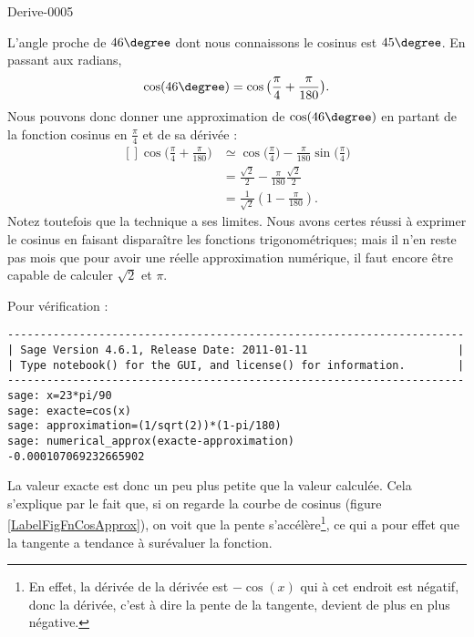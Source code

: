 
\begin{corrige}{Derive-0005}

    L'angle proche de $46\degree$ dont nous connaissons le cosinus est $45\degree$. En passant aux radians,
    \begin{equation}
        \cos(46\degree)=\cos\big( \frac{ \pi }{ 4 }+\frac{ \pi }{ 180 } \big).
    \end{equation}
    Nous pouvons donc donner une approximation de $\cos(46\degree)$ en partant de la fonction cosinus en $\frac{ \pi }{ 4 }$ et de sa dérivée :
    \begin{equation}
        \begin{aligned}[]
            \cos\big( \frac{ \pi }{ 4 }+\frac{ \pi }{ 180 } \big)&\simeq\cos\big( \frac{ \pi }{ 4 } \big)-\frac{ \pi }{ 180 }\sin\big( \frac{ \pi }{ 4 } \big)\\
            &=\frac{ \sqrt{2} }{2}-\frac{ \pi }{ 180 }\frac{ \sqrt{2} }{2}\\
            &=\frac{1}{ \sqrt{2} }\left( 1-\frac{ \pi }{ 180 } \right).
        \end{aligned}
    \end{equation}
    Notez toutefois que la technique a ses limites. Nous avons certes réussi à exprimer le cosinus en faisant disparaître les fonctions trigonométriques; mais il n'en reste pas mois que pour avoir une réelle approximation numérique, il faut encore être capable de calculer $\sqrt{2}$ et $\pi$.

    Pour vérification :
    \begin{verbatim}
----------------------------------------------------------------------
| Sage Version 4.6.1, Release Date: 2011-01-11                       |
| Type notebook() for the GUI, and license() for information.        |
----------------------------------------------------------------------
sage: x=23*pi/90 
sage: exacte=cos(x)
sage: approximation=(1/sqrt(2))*(1-pi/180)
sage: numerical_approx(exacte-approximation)
-0.000107069232665902
    \end{verbatim}
    La valeur exacte est donc un peu plus petite que la valeur calculée. Cela s'explique par le fait que, si on regarde la courbe de cosinus (figure \ref{LabelFigFnCosApprox}), on voit que la pente s'accélère\footnote{En effet, la dérivée de la dérivée est $-\cos(x)$ qui à cet endroit est négatif, donc la dérivée, c'est à dire la pente de la tangente, devient de plus en plus négative.}, ce qui a pour effet que la tangente a tendance à surévaluer la fonction.

    \newcommand{\CaptionFigFnCosApprox}{La fonction cosinus autour de $\frac{ \pi }{2}$.}
    

\end{corrige}
